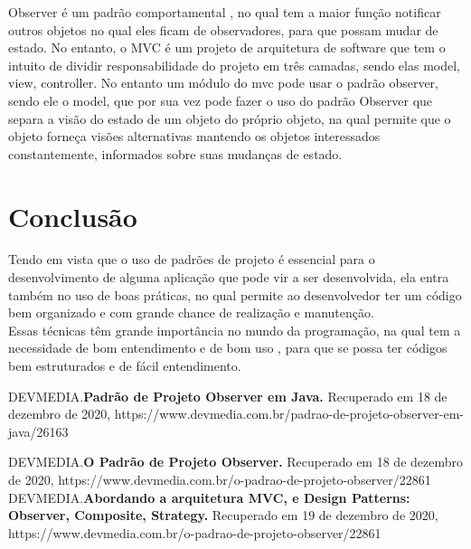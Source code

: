 \documentclass[a4paper]{article}
\begin{document}
  Observer é um padrão comportamental , no qual tem a maior função notificar outros 
  objetos no qual eles ficam de observadores, para que possam mudar de estado. 
  No entanto, o MVC é um projeto de arquitetura de software que tem o intuito de 
  dividir responsabilidade do projeto em três camadas, sendo elas model, view, controller. 
  No entanto um módulo do mvc pode usar o padrão observer, sendo ele o model, que 
  por sua vez pode fazer o uso do padrão Observer que separa a visão do estado de 
  um objeto do próprio objeto, na qual permite que o objeto forneça visões alternativas 
  mantendo os objetos interessados constantemente, informados sobre suas mudanças de estado.

  \section{Conclusão}
     

  Tendo em vista que o uso de padrões de projeto é essencial para o desenvolvimento 
  de alguma aplicação que pode vir a ser desenvolvida, ela entra também no uso de 
  boas práticas, no qual permite ao desenvolvedor ter um código bem organizado e 
  com grande chance de realização e manutenção. \\
  Essas técnicas têm grande importância no mundo da programação, na qual tem a 
  necessidade de bom entendimento e de bom uso , para que se possa ter códigos 
  bem estruturados e de fácil entendimento.


  \newpage
  \begin{thebibliography}{4}
    DEVMEDIA.\textbf{Padrão de Projeto Observer em Java.}
    Recuperado em 18 de dezembro de 2020,
   https://www.devmedia.com.br/padrao-de-projeto-observer-em-java/26163

   DEVMEDIA.\textbf{O Padrão de Projeto Observer.} 
   Recuperado em 18 de dezembro de 2020,
   https://www.devmedia.com.br/o-padrao-de-projeto-observer/22861
   DEVMEDIA.\textbf{Abordando a arquitetura MVC, e Design Patterns: Observer, Composite, Strategy.
   }
   Recuperado em 19 de dezembro de 2020,
   https://www.devmedia.com.br/o-padrao-de-projeto-observer/22861
   
   
   
    \end{thebibliography}

     
  
\end{document}
